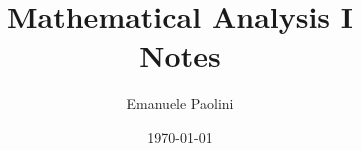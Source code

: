 \documentclass[
	fontsize=10pt, %
	twoside=true, %
	pagewidth=8.5in, %
	pageheight=11.0in, %
	numbers=noenddots, %
]{mykaobook}
\begin{document}
\nocite{forallx}

\title[Mathematical Analysis I Notes]{Mathematical Analysis I \\ Notes}
\author[EP]{Emanuele Paolini}
\date{\today}
\publishers{manu-fatto}


\frontmatter %



\maketitle

\thispagestyle{empty}
\mbox{}
\vfill
\doclicenseThis





\begingroup %

\setlength{\textheight}{230\vscale} %
\end{document}
